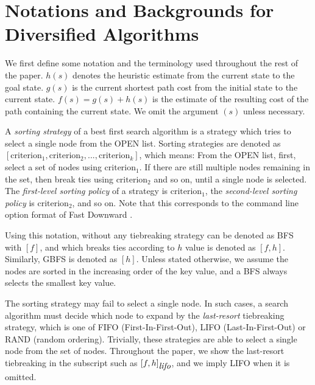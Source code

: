 \label{sec:gbfs}

\section{Notations and Backgrounds for \\Diversified Algorithms}

We first define some notation and the terminology used throughout the
rest of the paper.
$h(s)$ denotes the heuristic estimate from the current state to the
goal state.
$g(s)$ is the current shortest path cost from the initial state to the
current state.
$f(s)=g(s)+h(s)$ is the estimate of the resulting cost of the path
containing the current state.
We omit the argument $(s)$ unless necessary.

A \emph{sorting strategy} of a best first search algorithm is a strategy
which tries to select a single node from the OPEN list.
Sorting strategies are denoted as $[\text{criterion}_1, \text{criterion}_2, ..., \text{criterion}_k]$,
which means: From the OPEN list, first, select a set of nodes using $\text{criterion}_1$.
If there are still multiple nodes remaining in the set, then break ties
using $\text{criterion}_2$ and so on,
until a single node is selected.
The \emph{first-level sorting policy} of a strategy is
$\text{criterion}_1$, the \emph{second-level sorting policy} is
$\text{criterion}_2$, and so on.
Note that this corresponds to the command line option format of Fast
Downward \cite{Helmert2006}.

Using this notation, \astar without any tiebreaking strategy can be
denoted as BFS with $[f]$, and \astar which breaks ties according to $h$
value is denoted as $[f,h]$. Similarly, GBFS is denoted as 
$[h]$.  Unless stated otherwise, we assume the nodes are sorted in the
increasing order of the key value, and a BFS always selects the smallest
key value.



The sorting strategy may fail to select a single node. In such cases, a
search algorithm must decide which node to expand by the
\emph{last-resort} tiebreaking strategy, which is one of FIFO
(First-In-First-Out), LIFO (Last-In-First-Out) or RAND (random
ordering).  Trivially, these strategies are able to select a single node
from the set of nodes.  Throughout the paper, we show the last-resort
tiebreaking in the subscript such as $[f,h]_{{\mbox{\textit{lifo}}}}$, and we imply LIFO
when it is omitted.

